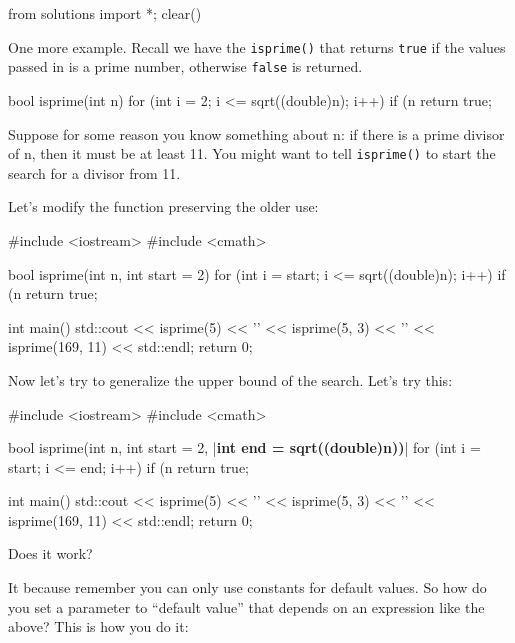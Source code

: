 \begin{python0}
from solutions import *; clear()
\end{python0}

One more example. Recall we have the \texttt{isprime()} that returns \texttt{true} if the values passed in is a prime number, otherwise \texttt{false} is returned.

\begin{consolethree}[escapeinside=||]
bool isprime(int n)
{
    for (int i = 2; i <= sqrt((double)n); i++)
    {
        if (n %
    }
    return true;
}
\end{consolethree}

Suppose for some reason you know something about n: if there is a prime divisor of n, then it must be at least 11. You might want to tell \texttt{isprime()} to start the search for a divisor from 11.

Let's modify the function preserving the older use:

\begin{consolethree}[escapeinside=||]
#include <iostream>
#include <cmath>

bool isprime(int n, int start = 2)
{
    for (int i = start; i <= sqrt((double)n); i++)
    {
        if (n %
    }
    return true;
}

int main()
{
    std::cout << isprime(5) << '\n'
              << isprime(5, 3) << '\n'
              << isprime(169, 11) << std::endl;
    return 0;
}
\end{consolethree}

Now let's try to generalize the upper bound of the search. Let's try this:

\begin{consolethree}[escapeinside=||]
#include <iostream>
#include <cmath>

bool isprime(int n,
             int start = 2,
             |\textbf{int end = sqrt((double)n))}|
{
    for (int i = start; i <= end; i++)
    {
        if (n %
    }
    return true;
}

int main()
{
    std::cout << isprime(5) << '\n'
              << isprime(5, 3) << '\n'
              << isprime(169, 11) << std::endl;
    return 0;
}
\end{consolethree}

Does it work?

It  because remember you can only use constants for default values. So how do you set a parameter to ``default value'' that depends on an expression like the above? This is how you do it:

